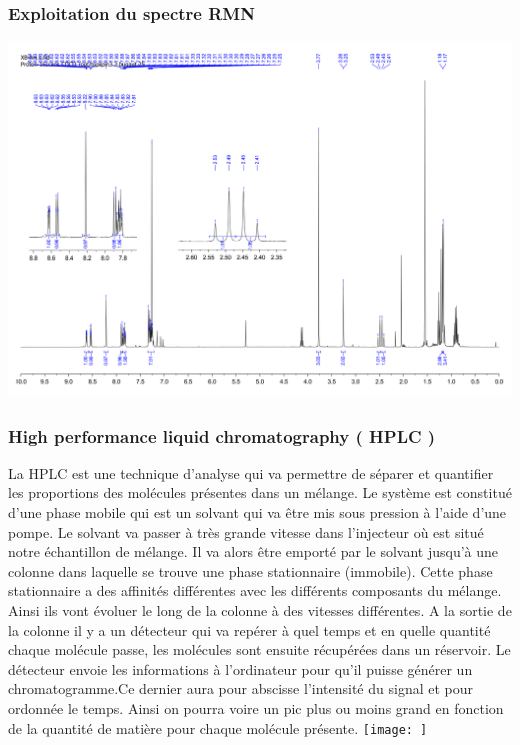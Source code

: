 \documentclass{article}
\begin{document}
\subsubsection{Exploitation du spectre RMN}

\begin{center}
\includegraphics[scale = 0.18]{Courbes_RMN}
\end{center}



\subsubsection{High performance liquid chromatography ( HPLC )}


La HPLC est une technique d’analyse qui va permettre de séparer et quantifier les proportions des molécules présentes dans un mélange. Le système est constitué d’une phase mobile qui est un solvant qui va être mis sous pression à l’aide d’une pompe. Le solvant va passer à très grande vitesse dans l’injecteur où est situé notre échantillon de mélange. Il va alors être emporté par le solvant jusqu’à une colonne dans laquelle se trouve une phase stationnaire (immobile). Cette phase stationnaire a des affinités différentes avec les différents composants du mélange. Ainsi ils vont évoluer le long de la colonne à des vitesses différentes. A la sortie de la colonne il y a un détecteur qui va repérer à quel temps et en quelle quantité chaque molécule passe, les molécules sont ensuite récupérées dans un réservoir. Le détecteur envoie les informations à l’ordinateur pour qu’il puisse générer un chromatogramme.Ce dernier aura pour abscisse l’intensité du signal et pour ordonnée  le temps. Ainsi on pourra voire un pic plus ou moins grand en fonction de la quantité de matière pour chaque molécule présente.
\texttt{[image: ]}
\end{document}
